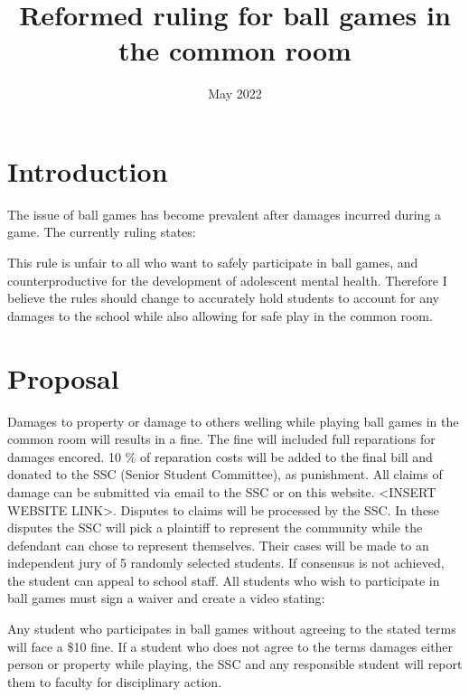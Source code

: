 \documentclass[10pt, letterpaper, twoside]{article}
\title{\textbf{Reformed ruling for ball games in the common room}}
\date{May 2022}
\begin{document}
\maketitle


\section*{\textbf{Introduction}}
\footnotesize The issue of ball games has become prevalent after damages incurred during a game. The currently ruling states: 


This rule is unfair to all who want to safely participate in ball games, and counterproductive for the development of adolescent mental health. Therefore I believe the rules should change to accurately hold students to account for any damages to the school while also allowing for safe play in the common room.

\section*{\textbf{Proposal}}
\footnotesize Damages to property or damage to others welling while playing ball games in the common room will results in a fine. The fine will included full reparations for damages encored. 10 \% of reparation costs will be added to the final bill and donated to the SSC (Senior Student Committee), as punishment. All claims of damage can be submitted via email to the SSC or on this website. <INSERT WEBSITE LINK>. Disputes to claims will be processed by the SSC. In these disputes the SSC will pick a plaintiff to represent the community while the defendant can chose to represent themselves. Their cases will be made to an independent jury of 5 randomly selected students. If consensus is not achieved, the student can appeal to school staff. All students who wish to participate in ball games must sign a waiver and create a video stating:


Any student who participates in ball games without agreeing to the stated terms will face a \$10 fine. If a student who does not agree to the terms damages either person or property while playing, the SSC and any responsible student will report them to faculty for disciplinary action.    
\end{document}
